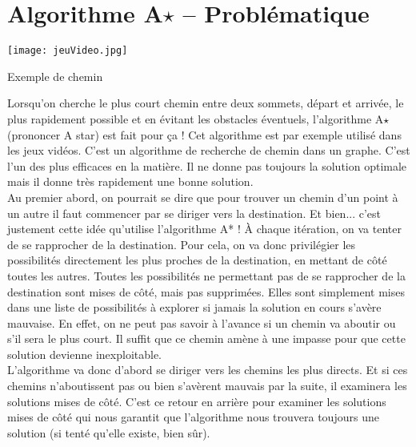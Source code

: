 % 
 
\section{Algorithme A$\star$ -- Problématique}



\begin{marginfigure}
\texttt{[image: jeuVideo.jpg]}
\caption{Exemple de chemin}
\end{marginfigure}



Lorsqu'on cherche le plus court chemin entre deux sommets, départ et arrivée, le plus rapidement possible et en évitant les obstacles éventuels, l'algorithme A$\star$ (prononcer A star) est fait pour ça ! Cet algorithme est par exemple utilisé dans les jeux vidéos.
C'est un algorithme de recherche de chemin dans un graphe. C'est l'un des plus efficaces en la matière. Il ne donne pas toujours la solution optimale mais il donne très rapidement une bonne solution.\\


Au premier abord, on pourrait se dire que pour trouver un chemin d'un point à un autre il faut commencer par se diriger vers la destination. Et bien... c'est justement cette idée qu'utilise l'algorithme A* ! À chaque itération, on va tenter de se rapprocher de la destination. Pour cela, on va donc privilégier les possibilités directement les plus proches de la destination, en mettant de côté toutes les autres. Toutes les possibilités ne permettant pas de se rapprocher de la destination sont mises de côté, mais pas supprimées. Elles
sont simplement mises dans une liste de possibilités à explorer si jamais la solution en cours s'avère mauvaise.
En effet, on ne peut pas savoir à l'avance si un chemin va aboutir ou s'il sera le plus court. Il suffit que ce chemin amène à une impasse pour que cette solution devienne inexploitable.\\
L'algorithme va donc d'abord se diriger vers les chemins les plus directs. Et si ces chemins n'aboutissent pas ou bien s'avèrent mauvais par la suite, il examinera les solutions mises de côté. C'est ce retour en arrière pour examiner les solutions mises de côté qui nous garantit que l'algorithme nous trouvera toujours une solution (si
tenté qu'elle existe, bien sûr).




